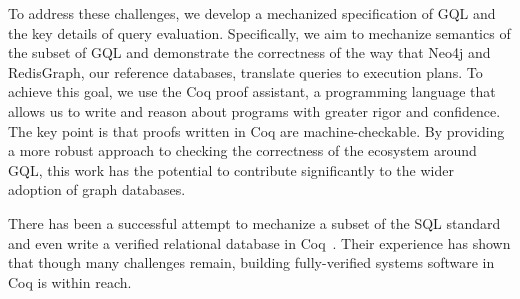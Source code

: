 \documentclass[14pt]{constructor-thesis}
\theoremstyle{definition}
\begin{document}
To address these challenges, we develop a mechanized specification of GQL and the key details of query evaluation. Specifically, we aim to mechanize semantics of the subset of GQL and demonstrate the correctness of the way that Neo4j and RedisGraph, our reference databases, translate queries to execution plans. To achieve this goal, we use the Coq proof assistant, a programming language that allows us to write and reason about programs with greater rigor and confidence. The key point is that proofs written in Coq are machine-checkable. By providing a more robust approach to checking the correctness of the ecosystem around GQL, this work has the potential to contribute significantly to the wider adoption of graph databases.

There has been a successful attempt to mechanize a subset of the SQL standard~\cite{sql-in-coq} and even write a verified relational database in Coq~\cite{rdbms-in-coq}. Their experience has shown that though many challenges remain, building fully-verified systems software in Coq is within reach.






\end{document}
